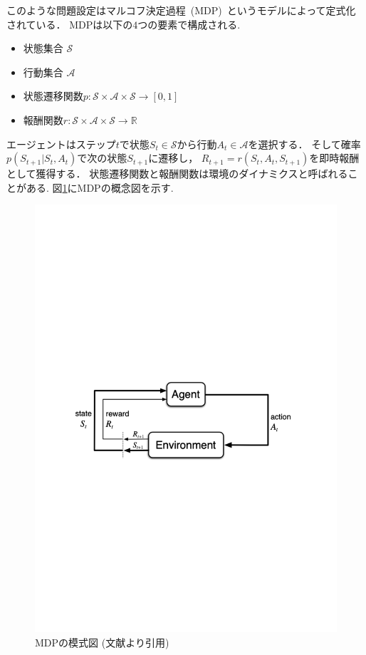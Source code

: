 このような問題設定はマルコフ決定過程~(MDP)~というモデルによって定式化されている．
MDPは以下の$4$つの要素で構成される. 
\begin{itemize}
  \item 状態集合 $\mathcal{S}$
  \item 行動集合 $\mathcal{A}$
  \item 状態遷移関数$p:\mathcal{S} \times \mathcal{A} \times \mathcal{S} \rightarrow [0,1]$
  \item 報酬関数$r:\mathcal{S} \times \mathcal{A} \times \mathcal{S} \rightarrow \mathbb{R}$
\end{itemize}
エージェントはステップ$t$で状態$S_t \in \mathcal{S}$から行動$A_t \in \mathcal{A}$を選択する．
そして確率$p(S_{t+1}|S_t, A_t)$で次の状態$S_{t+1}$に遷移し， $R_{t+1} = r(S_t, A_t, S_{t+1})$を即時報酬として獲得する．
状態遷移関数と報酬関数は環境のダイナミクスと呼ばれることがある. 
図\ref{fig:mdp}にMDPの概念図を示す.
\begin{figure}[h]
  \centering
  \includegraphics[width=\linewidth{}]{figures/MDP.pdf}
  \caption{MDPの模式図 (文献\cite{Sutton1998}より引用)}
  \label{fig:mdp}
\end{figure}

